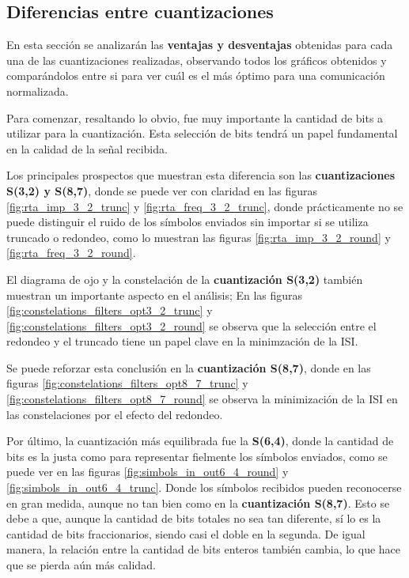 \documentclass[12pt, a4paper]{article}
\begin{document}
\subsection{Diferencias entre cuantizaciones}

En esta sección se analizarán las \textbf{ventajas y desventajas} obtenidas para cada una
de las cuantizaciones realizadas, observando todos los gráficos obtenidos y comparándolos
entre si para ver cuál es el más óptimo para una comunicación normalizada.

Para comenzar, resaltando lo obvio, fue muy importante la cantidad de bits a utilizar para la cuantización.
Esta selección de bits tendrá un papel fundamental en la calidad de la señal recibida.

Los principales prospectos que muestran esta diferencia son las \textbf{cuantizaciones S(3,2) y S(8,7)}, donde se
puede ver con claridad en las figuras \ref{fig:rta_imp_3_2_trunc} y \ref{fig:rta_freq_3_2_trunc}, donde prácticamente
no se puede distinguir el ruido de los símbolos enviados sin importar si se utiliza truncado o redondeo, como lo muestran las figuras
\ref{fig:rta_imp_3_2_round} y \ref{fig:rta_freq_3_2_round}.

El diagrama de ojo y la constelación de la \textbf{cuantización S(3,2)} también muestran un importante
aspecto en el análisis; En las figuras \ref{fig:constelations_filters_opt3_2_trunc} y \ref{fig:constelations_filters_opt3_2_round}
se observa que la selección entre el redondeo y el truncado tiene un papel clave en la minimzación de la ISI.

Se puede reforzar esta conclusión en la \textbf{cuantización S(8,7)}, donde en las figuras
\ref{fig:constelations_filters_opt8_7_trunc} y \ref{fig:constelations_filters_opt8_7_round} se observa
la minimización de la ISI en las constelaciones por el efecto del redondeo.

Por último, la cuantización más equilibrada fue la \textbf{S(6,4)}, donde la cantidad de bits es la justa
como para representar fielmente los símbolos enviados, como se puede ver en las figuras \ref{fig:simbols_in_out6_4_round} y \ref{fig:simbols_in_out6_4_trunc}. Donde
los símbolos recibidos pueden reconocerse en gran medida, aunque no tan bien como en la \textbf{cuantización S(8,7)}. Esto se debe a que, aunque la cantidad de bits 
totales no sea tan diferente, sí lo es la cantidad de bits fraccionarios, siendo casi el doble en la segunda. De igual manera, 
la relación entre la cantidad de bits enteros también cambia, lo que hace que se pierda aún más calidad.
\end{document}
